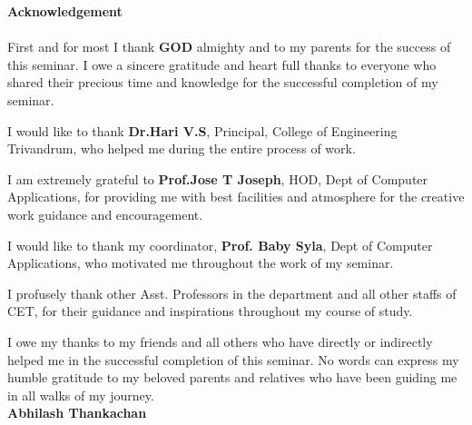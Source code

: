 \begin{titlepage}
\begin{center}
\textbf{\LARGE{Acknowledgement}}\\[0.5cm] 
\end{center}
\paragraph{}
First and for most I thank \textbf{GOD} almighty and to my parents for the success of this seminar. I owe a sincere gratitude and heart full thanks to everyone who shared their precious time and knowledge for the successful completion of my seminar.

I would like to thank \textbf{Dr.Hari V.S}, Principal,  College of Engineering Trivandrum, who helped me during the entire process of work.

I am extremely grateful to \textbf{Prof.Jose T Joseph}, HOD, Dept of Computer Applications, for providing me with best facilities and atmosphere for the creative work guidance and encouragement.

I would like to thank my coordinator,\textbf{ Prof. Baby Syla}, Dept of Computer Applications, who motivated me throughout the work of my seminar.  

I profusely thank other Asst. Professors in the department and all other staffs of CET, for their guidance and inspirations throughout my course of study.

I owe my thanks to my friends and all others who have directly or indirectly helped me in the successful completion of this seminar. No words can express my humble gratitude to my beloved parents and relatives who have been guiding me in all walks of my journey.\\

 \vspace{1.1cm}
\hspace{345pt} \textbf{Abhilash Thankachan}


\end{titlepage}
